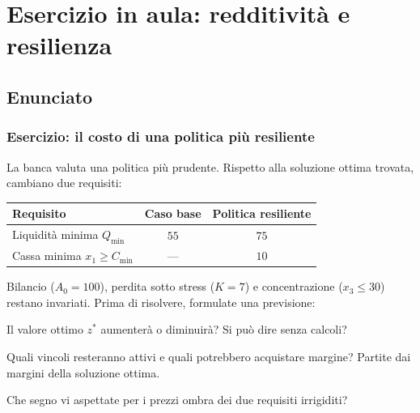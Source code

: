 \section{Esercizio in aula: redditivit\`{a} e resilienza}



\subsection{Enunciato}%

\begin{frame}%
%

\frametitle{Esercizio: il costo di una politica pi\`{u} resiliente}%
%

%


La banca valuta una politica pi\`{u} prudente. Rispetto alla soluzione ottima
trovata, cambiano due requisiti:

\begin{center}
{\small
\begin{tabular}
[c]{lcc}\hline
\textbf{Requisito} & \textbf{Caso base} & \textbf{Politica resiliente}\\\hline
Liquidit\`{a} minima $Q_{\min}$ & $55$ & $75$\\
Cassa minima $x_{1}\geq C_{\min}$ & --- & $10$\\\hline
\end{tabular}
}
\end{center}

Bilancio ($A_{0}=100$), perdita sotto stress ($K=7$) e concentrazione
($x_{3}\leq30$) restano invariati. Prima di risolvere, formulate una previsione:

\begin{stepitemize}
\item Il valore ottimo $z^{\ast}$ aumenter\`{a} o diminuir\`{a}? Si pu\`{o}
dire senza calcoli?

\item Quali vincoli resteranno attivi e quali potrebbero acquistare margine?
Partite dai margini della soluzione ottima.

\item Che segno vi aspettate per i prezzi ombra dei due requisiti irrigiditi?
\end{stepitemize}

%

\transboxout
\end{frame}%


